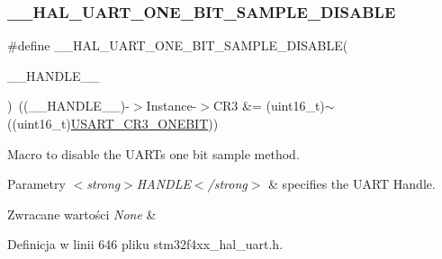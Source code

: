 \subsubsection{\texorpdfstring{\+\_\+\+\_\+\+H\+A\+L\+\_\+\+U\+A\+R\+T\+\_\+\+O\+N\+E\+\_\+\+B\+I\+T\+\_\+\+S\+A\+M\+P\+L\+E\+\_\+\+D\+I\+S\+A\+B\+LE}{\_\_HAL\_UART\_ONE\_BIT\_SAMPLE\_DISABLE}}
{\footnotesize\ttfamily \#define \+\_\+\+\_\+\+H\+A\+L\+\_\+\+U\+A\+R\+T\+\_\+\+O\+N\+E\+\_\+\+B\+I\+T\+\_\+\+S\+A\+M\+P\+L\+E\+\_\+\+D\+I\+S\+A\+B\+LE(\begin{DoxyParamCaption}\item[{}]{\+\_\+\+\_\+\+H\+A\+N\+D\+L\+E\+\_\+\+\_\+ }\end{DoxyParamCaption})~((\+\_\+\+\_\+\+H\+A\+N\+D\+L\+E\+\_\+\+\_\+)-\/$>$Instance-\/$>$C\+R3 \&= (uint16\+\_\+t)$\sim$((uint16\+\_\+t)\hyperlink{group___peripheral___registers___bits___definition_ga9a96fb1a7beab602cbc8cb0393593826}{U\+S\+A\+R\+T\+\_\+\+C\+R3\+\_\+\+O\+N\+E\+B\+IT}))}



Macro to disable the U\+A\+RT\textquotesingle{}s one bit sample method. 


\begin{DoxyParams}{Parametry}
{\em $<$strong$>$\+H\+A\+N\+D\+L\+E$<$/strong$>$} & specifies the U\+A\+RT Handle. \\
\hline
\end{DoxyParams}

\begin{DoxyRetVals}{Zwracane wartości}
{\em None} & \\
\hline
\end{DoxyRetVals}


Definicja w linii 646 pliku stm32f4xx\+\_\+hal\+\_\+uart.\+h.

\mbox{\label{group___u_a_r_t___exported___macros_ga3524747e5896296ab066d786431503ce}} 
